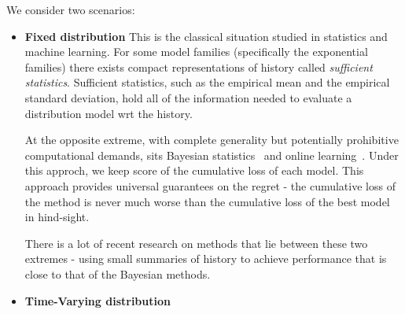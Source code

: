 We consider two scenarios:
\begin{itemize}
\item {\bf Fixed distribution}
This is the classical situation studied in statistics and machine
learning. For some model families (specifically the exponential
families) there exists compact representations of history called 
{\em sufficient statistics}. Sufficient statistics, such as the
empirical mean and the empirical standard deviation, hold all of the
information needed to evaluate a distribution model wrt the history. 

At the opposite extreme, with complete generality but potentially
prohibitive computational demands, sits Bayesian statistics~\cite{}
and online learning~\cite{Cesa-BianchiLugosi}. Under this approch,
we keep score of the cumulative loss of each model. This approach
provides universal guarantees on the regret - the cumulative loss of
the method is never much worse than the cumulative loss of the best
model in hind-sight.

There is a lot of recent research on methods that lie between these
two extremes - using small summaries of history to achieve performance
that is close to that of the Bayesian methods.

\item {\bf Time-Varying distribution}


\end{itemize}
